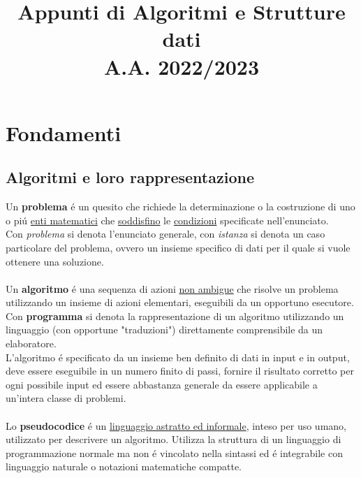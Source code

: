 \documentclass{article}
\title{
	Appunti di Algoritmi e Strutture dati \\
	\large A.A. 2022/2023
}
\date{}
\begin{document}
\maketitle

\section{Fondamenti}

\subsection{Algoritmi e loro rappresentazione}
Un \textbf{problema} é un quesito che richiede la determinazione o la costruzione di uno o piú \underline{enti matematici} che \underline{soddisfino} le \underline{condizioni} specificate nell'enunciato.\\
Con \textit{problema} si denota l'enunciato generale, con \textit{istanza} si denota un caso particolare del problema, ovvero un insieme specifico di dati per il quale si vuole ottenere una soluzione.\\\\
Un \textbf{algoritmo} é una sequenza di azioni \underline{non ambigue} che risolve un problema utilizzando un insieme di azioni elementari, eseguibili da un opportuno esecutore. Con \textbf{programma} si denota la rappresentazione di un algoritmo utilizzando un linguaggio (con opportune "traduzioni") direttamente comprensibile da un elaboratore.\\
L'algoritmo é specificato da un insieme ben definito di dati in input e in output, deve essere eseguibile in un numero finito di passi, fornire il risultato corretto per ogni possibile input ed essere abbastanza generale da essere applicabile a un'intera classe di problemi.\\\\
Lo \textbf{pseudocodice} é un \underline{linguaggio astratto ed informale}, inteso per uso umano, utilizzato per descrivere un algoritmo. Utilizza la struttura di un linguaggio di programmazione normale ma non é vincolato nella sintassi ed é integrabile con linguaggio naturale o notazioni matematiche compatte.
\end{document}
